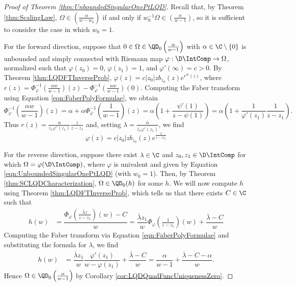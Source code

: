 \documentclass{article}
\numberwithin{equation}{section}
\begin{document}
\begin{proof}[Proof of Theorem \ref{thm:UnboundedSingularOnePtLQD}]\label{proof:UnboundedSingularOnePtLQD}
Recall that, by Theorem \ref{thm:ScalingLaw}, $\Omega\in\left(\frac{\alpha}{w-w_0}\right)$ if and only if $w_0^{-1}\Omega\in\left(\frac{\alpha}{w-1}\right)$, so it is sufficient to consider the case in which $w_0=1$.

For the forward direction, suppose that $0\in\Omega\in\QD_0\left(\frac{\alpha}{w-1}\right)$ with $\alpha\in\C\setminus\{0\}$ is unbounded and simply connected with Riemann map $\varphi:\D\IntComp\rightarrow\Omega$, normalized such that $\varphi(z_0)=0$, $\varphi(z_1)=1$, and $\varphi'(\infty)=c>0$. By Theorem \ref{thm:LQDFTInverseProb}, $\varphi(z)=c|z_0|zb_{z_0}(z)e^{r^{\#}(z)}$, where $r(z)=\Phi_{\varphi}^{-1}\left(\frac{\alpha w}{w-1}\right)(z)-\Phi_{\varphi}^{-1}\left(\frac{\alpha w}{w-1}\right)(0)$. Computing the Faber transform using Equation \ref{eqn:FaberPolyFormulae}, we obtain
$$\Phi_{\varphi}^{-1}\left(\frac{\alpha w}{w-1}\right)(z)=\alpha+\alpha\Phi_{\varphi}^{-1}\left(\frac{1}{w-1}\right)(z)=\alpha\left(1+\dfrac{\psi'(1)}{z-\psi(1)}\right)=\alpha\left(1+\dfrac{1}{\varphi'(z_1)}\dfrac{1}{z-z_1}\right).$$
Thus $r(z)=\frac{\alpha}{z_1\varphi'(z_1)}\frac{z}{z-z_1}$ and, setting $\lambda=\frac{\overline{\alpha}}{\overline{z_1}\overline{\varphi'(z_1)}}$, we find
$$\varphi(z)=c|z_0|zb_{z_0}(z)e^{\frac{\lambda}{1-z\overline{z_1}}}$$

For the reverse direction, suppose there exist $\lambda\in\C$ and $z_0,z_1\in\D\IntComp$ for which $\Omega=\varphi(\D\IntComp)$, where $\varphi$ is univalent and given by Equation \ref{eqn:UnboundedSingularOnePtLQD} (with $w_0=1$). Then, by Theorem \ref{thm:SCLQDCharacterization}, $\Omega\in\QD_0(h)$ for some $h$. We will now compute $h$ using Theorem \ref{thm:LQDFTInverseProb}, which tells us that there exists $C\in\C$ such that
\begin{align*}
h(w)&=\dfrac{\Phi_{\varphi}\left(\frac{\overline{\lambda}z}{z-z_1}\right)(w)-C}{w}=\dfrac{\overline{\lambda}z_1}{w}\Phi_{\varphi}\left(\frac{1}{z-z_1}\right)(w)+\dfrac{\overline{\lambda}-C}{w}
\end{align*}
Computing the Faber transform via Equation \ref{eqn:FaberPolyFormulae} and substituting the formula for $\lambda$, we find
\begin{align*}
h(w)&=\dfrac{\overline{\lambda}z_1}{w}\dfrac{\varphi'(z_1)}{w-\varphi(z_1)}+\dfrac{\overline{\lambda}-C}{w}=\dfrac{\alpha}{w-1}+\dfrac{\overline{\lambda}-C-\alpha}{w}.
\end{align*}
Hence $\Omega\in\QD_0\left(\frac{\alpha}{w-1}\right)$ by Corollary \ref{cor:LQDQuadFuncUniquenessZero}.


\end{proof}
\end{document}
